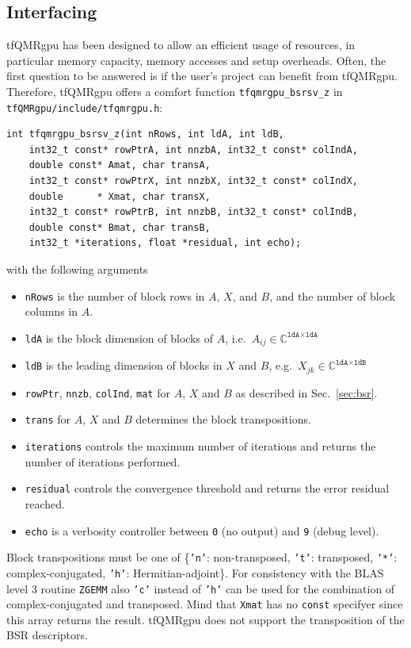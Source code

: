 \documentclass[oribibl]{llncs}
\newcommand{\ttt}[1]{\texttt{#1}}
\newcommand{\codename}{tfQMRgpu}
\begin{document}
\subsection{Interfacing}
%
\codename{} has been designed to allow an efficient usage of resources, in particular
memory capacity, memory accesses and setup overheads.
Often, the first question to be answered is if the user's project can benefit from \codename{}.
Therefore, \codename{} offers a comfort function \ttt{tfqmrgpu\_bsrsv\_z} in \ttt{tfQMRgpu/include/tfqmrgpu.h}:
\lstset{language=C}
\begin{lstlisting}
int tfqmrgpu_bsrsv_z(int nRows, int ldA, int ldB,
    int32_t const* rowPtrA, int nnzbA, int32_t const* colIndA,
    double const* Amat, char transA,
    int32_t const* rowPtrX, int nnzbX, int32_t const* colIndX,
    double      * Xmat, char transX,
    int32_t const* rowPtrB, int nnzbB, int32_t const* colIndB,
    double const* Bmat, char transB,
	int32_t *iterations, float *residual, int echo);
\end{lstlisting}
with the following arguments
\begin{itemize}
	\item \ttt{nRows} is the number of block rows in $A$, $X$, and $B$, and the number of block columns in $A$.
	\item \ttt{ldA} is the block dimension of blocks of $A$, i.e.~$A_{ij} \in \mathbb{C}^{\ttt{ldA}\times\ttt{ldA}}$
	\item \ttt{ldB} is the leading dimension of blocks in $X$ and $B$, e.g.~$X_{jk} \in \mathbb{C}^{\ttt{ldA}\times\ttt{ldB}}$
	\item \ttt{rowPtr}, \ttt{nnzb}, \ttt{colInd}, \ttt{mat} for $A$, $X$ and $B$ as described in Sec.~\ref{sec:bsr}.
	\item \ttt{trans} for $A$, $X$ and $B$ determines the block transpositions.
	\item \ttt{iterations} controls the maximum number of iterations and returns the number of iterations performed.
	\item \ttt{residual} controls the convergence threshold and returns the error residual reached.
	\item \ttt{echo} is a verbosity controller between \ttt{0} (no output) and \ttt{9} (debug level).
\end{itemize}

\noindent
Block transpositions must be one of \{\ttt{'n'}: non-transposed, \ttt{'t'}: transposed, \ttt{'*'}: complex-conjugated, \ttt{'h'}: Hermitian-adjoint\}. For consistency with the BLAS level 3 routine \ttt{ZGEMM} also \ttt{'c'} instead of \ttt{'h'} can be used for the combination of complex-conjugated and transposed.
Mind that \ttt{Xmat} has no \ttt{const} specifyer since this array returns the result.
\codename{} does not support the transposition of the BSR descriptors.
\end{document}
